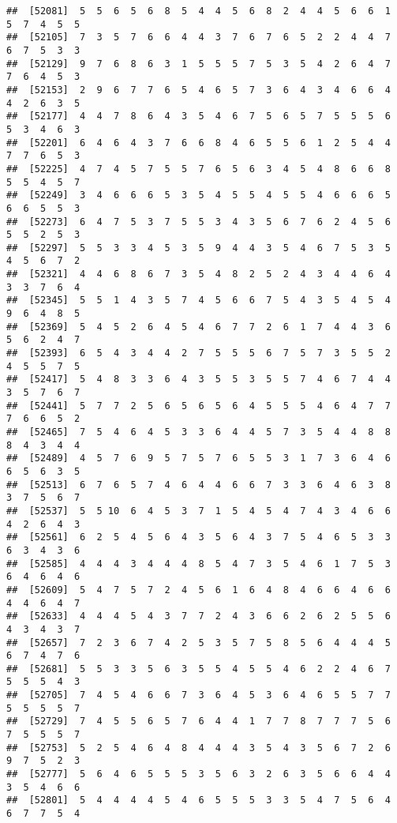 \documentclass[
]{book}
\begin{document}
\begin{verbatim}
##  [52081]  5  5  6  5  6  8  5  4  4  5  6  8  2  4  4  5  6  6  1  5  7  4  5  5
##  [52105]  7  3  5  7  6  6  4  4  3  7  6  7  6  5  2  2  4  4  7  6  7  5  3  3
##  [52129]  9  7  6  8  6  3  1  5  5  5  7  5  3  5  4  2  6  4  7  7  6  4  5  3
##  [52153]  2  9  6  7  7  6  5  4  6  5  7  3  6  4  3  4  6  6  4  4  2  6  3  5
##  [52177]  4  4  7  8  6  4  3  5  4  6  7  5  6  5  7  5  5  5  6  5  3  4  6  3
##  [52201]  6  4  6  4  3  7  6  6  8  4  6  5  5  6  1  2  5  4  4  7  7  6  5  3
##  [52225]  4  7  4  5  7  5  5  7  6  5  6  3  4  5  4  8  6  6  8  5  5  4  5  7
##  [52249]  3  4  6  6  6  5  3  5  4  5  5  4  5  5  4  6  6  6  5  6  6  5  5  3
##  [52273]  6  4  7  5  3  7  5  5  3  4  3  5  6  7  6  2  4  5  6  5  5  2  5  3
##  [52297]  5  5  3  3  4  5  3  5  9  4  4  3  5  4  6  7  5  3  5  4  5  6  7  2
##  [52321]  4  4  6  8  6  7  3  5  4  8  2  5  2  4  3  4  4  6  4  3  3  7  6  4
##  [52345]  5  5  1  4  3  5  7  4  5  6  6  7  5  4  3  5  4  5  4  9  6  4  8  5
##  [52369]  5  4  5  2  6  4  5  4  6  7  7  2  6  1  7  4  4  3  6  5  6  2  4  7
##  [52393]  6  5  4  3  4  4  2  7  5  5  5  6  7  5  7  3  5  5  2  4  5  5  7  5
##  [52417]  5  4  8  3  3  6  4  3  5  5  3  5  5  7  4  6  7  4  4  3  5  7  6  7
##  [52441]  5  7  7  2  5  6  5  6  5  6  4  5  5  5  4  6  4  7  7  7  6  6  5  2
##  [52465]  7  5  4  6  4  5  3  3  6  4  4  5  7  3  5  4  4  8  8  8  4  3  4  4
##  [52489]  4  5  7  6  9  5  7  5  7  6  5  5  3  1  7  3  6  4  6  6  5  6  3  5
##  [52513]  6  7  6  5  7  4  6  4  4  6  6  7  3  3  6  4  6  3  8  3  7  5  6  7
##  [52537]  5  5 10  6  4  5  3  7  1  5  4  5  4  7  4  3  4  6  6  4  2  6  4  3
##  [52561]  6  2  5  4  5  6  4  3  5  6  4  3  7  5  4  6  5  3  3  6  3  4  3  6
##  [52585]  4  4  4  3  4  4  4  8  5  4  7  3  5  4  6  1  7  5  3  6  4  6  4  6
##  [52609]  5  4  7  5  7  2  4  5  6  1  6  4  8  4  6  6  4  6  6  4  4  6  4  7
##  [52633]  4  4  4  5  4  3  7  7  2  4  3  6  6  2  6  2  5  5  6  4  3  4  3  7
##  [52657]  7  2  3  6  7  4  2  5  3  5  7  5  8  5  6  4  4  4  5  6  7  4  7  6
##  [52681]  5  5  3  3  5  6  3  5  5  4  5  5  4  6  2  2  4  6  7  5  5  5  4  3
##  [52705]  7  4  5  4  6  6  7  3  6  4  5  3  6  4  6  5  5  7  7  5  5  5  5  7
##  [52729]  7  4  5  5  6  5  7  6  4  4  1  7  7  8  7  7  7  5  6  7  5  5  5  7
##  [52753]  5  2  5  4  6  4  8  4  4  4  3  5  4  3  5  6  7  2  6  9  7  5  2  3
##  [52777]  5  6  4  6  5  5  5  3  5  6  3  2  6  3  5  6  6  4  4  3  5  4  6  6
##  [52801]  5  4  4  4  4  5  4  6  5  5  5  3  3  5  4  7  5  6  4  6  7  7  5  4

\end{verbatim}
\end{document}
